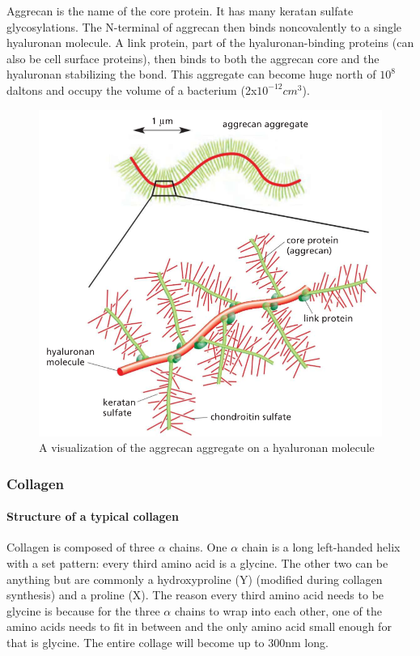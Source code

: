 \documentclass[../main.tex]{subfiles}
\begin{document}
Aggrecan is the name of the core protein. It has many keratan sulfate glycosylations. The N-terminal of aggrecan then binds noncovalently to a single hyaluronan molecule. A link protein, part of the hyaluronan-binding proteins (can also be cell surface proteins), then binds to both the aggrecan core and the hyaluronan stabilizing the bond. This aggregate can become huge north of $10^{8}$ daltons and occupy the volume of a bacterium (2x$10^{-12}cm^{3}$).

\begin{figure}[H]
	\centering
	\includegraphics[width=0.5\linewidth]{agg_comp}
	\caption{A visualization of the aggrecan aggregate on a hyaluronan molecule}
	\label{fig:aggcomp}
\end{figure}



\subsubsection{Collagen}

\paragraph{Structure of a typical collagen}
Collagen is composed of three $\alpha$ chains. One $\alpha$ chain is a long left-handed helix with a set pattern: every third amino acid is a \gls{glycine}. The other two can be anything but are commonly a \gls{hydroxyproline} (Y) (modified during collagen synthesis) and a \gls{proline} (X). The reason every third amino acid needs to be glycine is because for the three $\alpha$ chains to wrap into each other, one of the amino acids needs to fit in between and the only amino acid small enough for that is glycine. The entire collage will become up to 300nm long.
\end{document}

